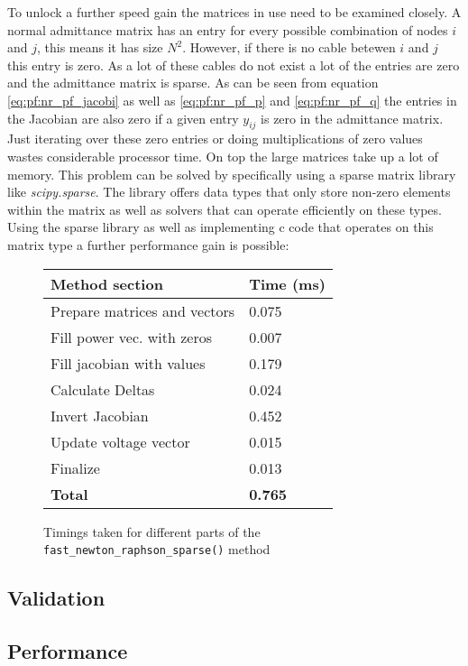 To unlock a further speed gain the matrices in use need to be examined closely. A normal admittance matrix has 
an entry for every possible combination of nodes $i$ and $j$, this means it has size $N^2$. However, if there is
no cable betewen $i$ and $j$ this entry is zero. As a lot of these cables do not exist a lot of the entries are zero
and the admittance matrix is sparse.
As can be seen from equation \ref{eq:pf:nr_pf_jacobi} as well as \ref{eq:pf:nr_pf_p} and \ref{eq:pf:nr_pf_q} the entries
in the Jacobian are also zero if a given entry $y_{ij}$ is zero in the admittance matrix.\\
Just iterating over these zero entries or doing multiplications of zero values wastes considerable processor time. On top
the large matrices take up a lot of memory. This problem can be solved by specifically using
a sparse matrix library like \textit{scipy.sparse}\autocite{2020SciPy-NMeth}. The library offers
data types that only store non-zero elements within the matrix as well as solvers that can operate
efficiently on these types.\\
Using the sparse library as well as implementing c code that operates on this matrix type a
further performance gain is possible:

\begin{figure}[H]
    \begin{center}
        \begin{tabular}{ll}
            \textbf{Method section} & \textbf{Time (ms)}\\
            \hline
            Prepare matrices and vectors & 0.075\\
            Fill power vec. with zeros &  0.007\\
            Fill jacobian with values & 0.179\\
            Calculate Deltas &      0.024\\
            Invert Jacobian &      0.452\\
            Update voltage vector & 0.015\\
            Finalize & 0.013\\
            \hline
            \textbf{Total} & \textbf{0.765}
        \end{tabular}
    \end{center}
\caption{Timings taken for different parts of the \texttt{fast\_newton\_raphson\_sparse()} method}
\end{figure}


\subsection{Validation}

\subsection{Performance}